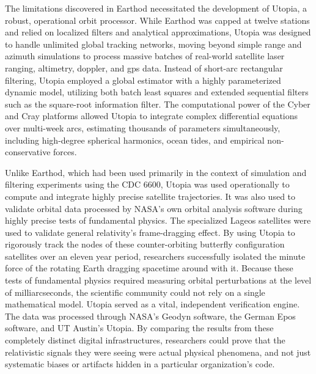 The limitations discovered in Earthod necessitated the development of Utopia, a robust, operational orbit processor. While Earthod was capped at twelve stations and relied on localized filters and analytical approximations, Utopia was designed to handle unlimited global tracking networks, moving beyond simple range and azimuth simulations to process massive batches of real-world satellite laser ranging, altimetry, doppler, and gps data. Instead of short-arc rectangular filtering, Utopia employed a global estimator with a highly parameterized dynamic model, utilizing both batch least squares and extended sequential filters such as the square-root information filter. The computational power of the Cyber and Cray platforms allowed Utopia to integrate complex differential equations over multi-week arcs, estimating thousands of parameters simultaneously, including high-degree spherical harmonics, ocean tides, and empirical non-conservative forces.

Unlike Earthod, which had been used primarily in the context of simulation and filtering experiments using the CDC 6600, Utopia was used operationally to compute and integrate highly precise satellite trajectories. It was also used to validate orbital data processed by NASA's own orbital analysis software during highly precise tests of fundamental physics. The specialized Lageos satellites were used to validate general relativity's frame-dragging effect. By using Utopia to rigorously track the nodes of these counter-orbiting butterfly configuration satellites over an eleven year period, researchers successfully isolated the minute force of the rotating Earth dragging spacetime around with it. Because these tests of fundamental physics required measuring orbital perturbations at the level of milliarcseconds, the scientific community could not rely on a single mathematical model. Utopia served as a vital, independent verification engine. The data was processed through NASA's Geodyn software, the German Epos software, and UT Austin's Utopia. By comparing the results from these completely distinct digital infrastructures, researchers could prove that the relativistic signals they were seeing were actual physical phenomena, and not just systematic biases or artifacts hidden in a particular organization’s code.

